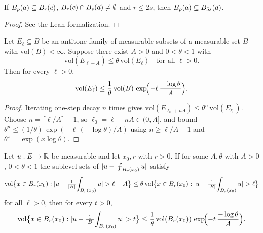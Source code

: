 \begin{lemma}
\label{lem:ball_subset_fivefold_of_inter_nonempty}
\leanok
If $B_{\rho}(a) \subseteq B_{r}(c)$, $B_{r}(c) \cap B_{s}(d) \neq \emptyset$
and $r \le 2 s$, then $B_{\rho}(a) \subseteq B_{5 s}(d)$.
\end{lemma}

\begin{proof}
\leanok
See the Lean formalization.
\end{proof}

\begin{lemma}
\label{lem:john_nirenberg_iteration_decay_iterate}
\leanok
Let $E_{\ell} \subseteq B$ be an antitone family of measurable subsets of a measurable
set $B$ with $\mathrm{vol}(B) < \infty$. Suppose there exist $A > 0$ and
$0 < \theta < 1$ with
\begin{equation*}
\mathrm{vol}(E_{\ell + A}) \le \theta\, \mathrm{vol}(E_{\ell})
\quad\text{for all } \ell > 0.
\end{equation*}
Then for every $\ell > 0$,
\begin{equation*}
\mathrm{vol}(E_{\ell})
\le \frac{1}{\theta}\, \mathrm{vol}(B)\,
\exp\!\Bigl(-\ell\, \frac{-\log \theta}{A}\Bigr).
\end{equation*}
\end{lemma}
\begin{proof}
\leanok

Iterating one-step decay $n$ times gives
$\mathrm{vol}(E_{\ell_0 + n A}) \le \theta^{n}\,\mathrm{vol}(E_{\ell_0})$. Choose
$n = \lceil \ell/A\rceil - 1$, so $\ell_0 = \ell - n A \in (0, A]$, and bound
$\theta^{n} \le (1/\theta)\, \exp(-\ell\,(-\log\theta)/A)$ using
$n \ge \ell/A - 1$ and $\theta^{x} = \exp(x\log\theta)$.
\end{proof}

\begin{theorem}
\label{thm:john_nirenberg_iteration}
\leanok
Let $u : E \to \mathbb{R}$ be measurable and let $x_0, r$ with $r > 0$. If for some $A,\theta$
with $A > 0$, $0 < \theta < 1$ the sublevel sets of $|u - \fint_{\Ball{r}{x_0}} u|$
satisfy
\begin{equation*}
\mathrm{vol}\bigl\{ x \in B_{r}(x_0) : \lvert u - \tfrac{1}{|B|}\!\int_{B_{r}(x_0)} u\rvert > \ell + A\bigr\}
\le \theta\, \mathrm{vol}\bigl\{ x \in B_{r}(x_0) : \lvert u - \tfrac{1}{|B|}\!\int_{B_{r}(x_0)} u\rvert > \ell\bigr\}
\end{equation*}
for all $\ell > 0$, then for every $t > 0$,
\begin{equation*}
\mathrm{vol}\bigl\{ x \in B_{r}(x_0) : \lvert u - \tfrac{1}{|B|}\!\int_{B_{r}(x_0)} u\rvert > t\bigr\}
\le \frac{1}{\theta}\, \mathrm{vol}(B_{r}(x_0))\,
\exp\!\Bigl(-t\,\frac{-\log\theta}{A}\Bigr).
\end{equation*}
\end{theorem}

